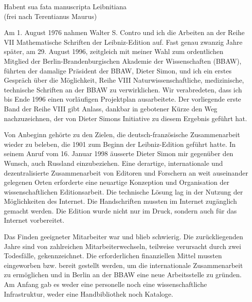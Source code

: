 \thispagestyle{empty}
{\vrule height 0mm depth 30mm width 0mm}
\begin{flushright}
Habent sua fata manuscripta Leibnitiana\\(frei nach Terentianus Maurus)
\end{flushright}
\par
\vspace{2.0ex}
Am 1. August 1976 nahmen Walter S. Contro und ich die Arbeiten an der Reihe VII Mathematische Schriften der Leibniz-Edition auf. Fast genau zwanzig Jahre sp\"{a}ter, am 29. August 1996, zeitgleich mit meiner Wahl zum ordentlichen Mitglied der Berlin-Brandenburgischen Akademie der Wissenschaften (BBAW), f\"{u}hrten der damalige Pr\"{a}sident der BBAW, Dieter Simon, und ich ein erstes Gespr\"{a}ch \"{u}ber die M\"{o}glichkeit, Reihe VIII Naturwissenschaftliche, medizinische, tech\-nische Schriften an der BBAW zu verwirklichen. Wir verabredeten, dass ich bis Ende 1996 einen vorl\"{a}ufigen Projektplan ausarbeitete. Der vorliegende erste Band der Reihe VIII gibt Anlass, dankbar in gebotener K\"{u}rze den Weg nachzuzeichnen, der von Dieter Simons Initiative zu diesem Ergebnis gef\"{u}hrt hat.\par
Von Anbeginn geh\"{o}rte zu den Zielen, die deutsch-franz\"{o}sische Zusammenarbeit wieder zu beleben, die 1901 zum Beginn der Leibniz-Edition gef\"{u}hrt hatte. In seinem Anruf vom 16. Januar 1998 \"{a}usserte Dieter Simon mir gegen\"{u}ber den Wunsch, auch Russland einzubeziehen. Eine derartige, internationale und dezentralisierte Zusammenarbeit von Editoren und Forschern an weit auseinander gelegenen Orten erforderte eine neuartige Konzeption und Organisation der wissenschaftlichen Editionsarbeit. Die technische L\"{o}sung lag in der Nutzung der M\"{o}glichkeiten des Internet. Die Handschriften mussten im Internet zug\"{a}nglich gemacht werden. Die Edition wurde nicht nur im Druck, sondern auch f\"{u}r das Internet vorbereitet.\par
Das Finden geeigneter Mitarbeiter war und blieb schwierig. Die zur\"{u}ckliegenden Jahre sind von zahlreichen Mitarbeiterwechseln, teilweise verursacht durch zwei Todesf\"{a}lle, gekennzeichnet. Die erforderlichen finanziellen Mittel mussten eingeworben bzw. bereit gestellt werden, um die internationale Zusammenarbeit zu erm\"{o}glichen und in Berlin an der BBAW eine neue Arbeitsstelle zu gr\"{u}nden. Am Anfang gab es weder eine personelle noch eine wissenschaftliche Infrastruktur, weder eine Handbibliothek noch Kataloge.\par \vspace{2.0ex}

